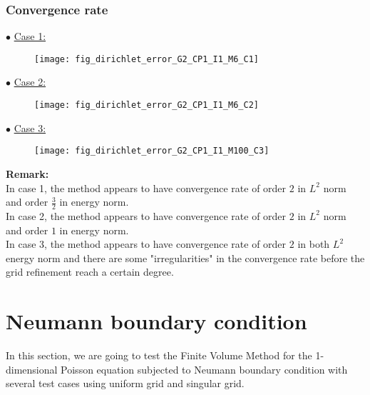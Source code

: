\documentclass{article}
\begin{document}
	\subsubsection{Convergence rate}
	\noindent$\bullet$ \underline{Case 1:}
	\begin{figure}[H]
		\centering	\texttt{[image: fig\_dirichlet\_error\_G2\_CP1\_I1\_M6\_C1]}
	\end{figure}
	\noindent$\bullet$ \underline{Case 2:}
	\begin{figure}[H]
		\centering	\texttt{[image: fig\_dirichlet\_error\_G2\_CP1\_I1\_M6\_C2]}
	\end{figure}
	\noindent$\bullet$ \underline{Case 3:}
	\begin{figure}[H]
		\centering	\texttt{[image: fig\_dirichlet\_error\_G2\_CP1\_I1\_M100\_C3]}
	\end{figure}
	\noindent\textbf{Remark:}\\
	In case 1, the method appears to have convergence rate of order $2$ in $L^2$ norm and order $\frac{3}{2}$ in energy norm.\\
	In case 2, the method appears to have convergence rate of order $2$ in $L^2$ norm and order $1$ in energy norm.\\
	In case 3, the method appears to have convergence rate of order $2$ in both $L^2$ energy norm and there are some "irregularities" in the convergence rate before the grid refinement reach a certain degree.\\

	\newpage

	\section{Neumann boundary condition}
	In this section, we are going to test the Finite Volume Method for the 1-dimensional Poisson equation subjected to Neumann boundary condition with several test cases using uniform grid and singular grid.
\end{document}

